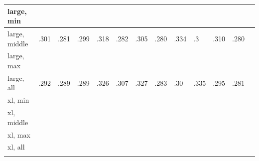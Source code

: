 \documentclass[10pt,letterpaper]{article}
\begin{document}
\begin{table}[!ht]
\begin{tabular}{|l|l|l|l|l|l|l|l|l|l|l|l|l|}
        large, min & ~ & ~ & ~ & ~ & ~ & ~ & ~ & ~ & ~ & ~ & ~ \\ \hline
        large, middle & .301 & .281 & .299 & .318 & .282 & .305 & .280 & .334 & .3 & .310 & .280 \\ \hline
        large, max & ~ & ~ & ~ & ~ & ~ & ~ & ~ & ~ & ~ & ~ & ~ \\ \hline
        large, all & .292 & .289 & .289 & .326 & .307 & .327 & .283 & .30 & .335 & .295 & .281 \\ \hline
        xl, min & ~ & ~ & ~ & ~ & ~ & ~ & ~ & ~ & ~ & ~ & ~ \\ \hline
        xl, middle & ~ & ~ & ~ & ~ & ~ & ~ & ~ & ~ & ~ & ~ & ~ \\ \hline
        xl, max & ~ & ~ & ~ & ~ & ~ & ~ & ~ & ~ & ~ & ~ & ~ \\ \hline
        xl, all & ~ & ~ & ~ & ~ & ~ & ~ & ~ & ~ & ~ & ~ & ~ \\ \hline
    \label{table3}
    \end{tabular}
\end{table}
\end{document}
